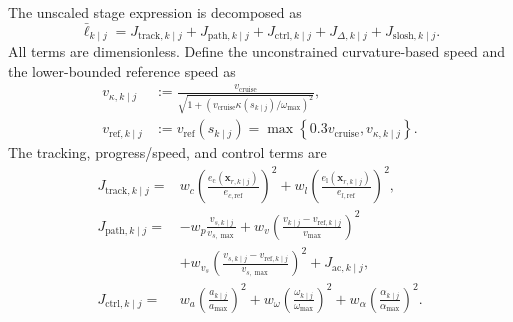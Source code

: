 The unscaled stage expression is decomposed as
\begin{equation}
  \bar\ell_{k\mid j}
  =J_{\mathrm{track},k\mid j}
  +J_{\mathrm{path},k\mid j}
  +J_{\mathrm{ctrl},k\mid j}
  +J_{\Delta,k\mid j}
  +J_{\mathrm{slosh},k\mid j}.
  \label{eq:stage_cost}
\end{equation}
All terms are dimensionless. Define the unconstrained curvature-based speed
and the lower-bounded reference speed as
\begin{equation}
\begin{aligned}
  v_{\kappa,k\mid j}
  &:=\frac{v_{\mathrm{cruise}}}
  {\sqrt{1+
  (v_{\mathrm{cruise}}\kappa(s_{k\mid j})/\omega_{\max})^2}},\\
  v_{\mathrm{ref},k\mid j}
  &:=v_{\mathrm{ref}}(s_{k\mid j})
  =\max\!\left\{0.3v_{\mathrm{cruise}},v_{\kappa,k\mid j}\right\}.
\end{aligned}
  \label{eq:curvature_speed_reference}
\end{equation}
The tracking, progress/speed, and control terms are
\begin{equation}
\begin{aligned}
J_{\mathrm{track},k\mid j}
={}&
w_c\!\left(
\frac{e_{\mathrm c}(\bm x_{r,k\mid j})}{e_{c,\mathrm{ref}}}
\right)^2
+w_l\!\left(
\frac{e_{\mathrm l}(\bm x_{r,k\mid j})}{e_{l,\mathrm{ref}}}
\right)^2,\\
J_{\mathrm{path},k\mid j}
={}&
-w_p\frac{v_{s,k\mid j}}{v_{s,\max}}
+w_v\!\left(
\frac{v_{k\mid j}-v_{\mathrm{ref},k\mid j}}{v_{\max}}
\right)^2\\
&+w_{v_s}\!\left(
\frac{v_{s,k\mid j}-v_{\mathrm{ref},k\mid j}}{v_{s,\max}}
\right)^2
+J_{\mathrm{ac},k\mid j},\\
J_{\mathrm{ctrl},k\mid j}
={}&
w_a\!\left(\frac{a_{k\mid j}}{a_{\max}}\right)^2
+w_\omega\!\left(\frac{\omega_{k\mid j}}{\omega_{\max}}\right)^2
+w_\alpha\!\left(\frac{\alpha_{k\mid j}}{\alpha_{\max}}\right)^2.
\end{aligned}
\label{eq:nonliquid_costs}
\end{equation}

